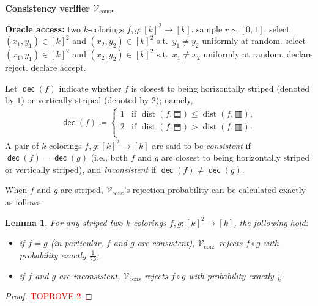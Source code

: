 \documentclass[11pt,fleqn]{article}
\renewcommand{\leq}{\leqslant}
\newcommand{\defeq}{\coloneq}
\DeclareMathOperator{\rHam}{\mathrm{dist}}
\DeclareMathOperator{\dec}{\mathsf{dec}}
\newcommand{\V}{\calV}
\newcommand{\Accept}{\textsf{accept}\xspace}
\newcommand{\Reject}{\textsf{reject}\xspace}
\newcommand{\f}{f}
\newcommand{\g}{g}
\newcommand{\hor}{\squarehfill}
\newcommand{\ver}{\squarevfill}
\newcommand{\Vcons}{\V_\mathrm{cons}}
\newcommand{\calV}{\mathcal{V}}
\newtheorem{lemma}[theorem]{Lemma}
\theoremstyle{definition}
\numberwithin{equation}{section}
\begin{document}
\begin{itembox}[l]{\textbf{Consistency verifier $\Vcons$.}}
\begin{algorithmic}[1]
    \item[\textbf{Oracle access:}]
        two $k$-colorings $\f, \g \colon [k]^2 \to [k]$.
    \State sample $r \sim [0,1]$.
    \If{$0 \leq r < \frac{1}{2}$} 
        \State select $(x_1,y_1) \in [k]^2$ and $(x_2,y_2) \in [k]^2$
            s.t.~$y_1 \neq y_2$ uniformly at random.
    \Else {}
        \State select $(x_1,y_1) \in [k]^2$ and $(x_2,y_2) \in [k]^2$
            s.t.~$x_1 \neq x_2$ uniformly at random.
    \EndIf
    \If{$\f(x_1,y_1) = \g(x_2,y_2)$}
        \State declare \Reject.
    \Else
        \State declare \Accept.
    \EndIf
\end{algorithmic}
\end{itembox}


Let $\dec(\f)$ indicate whether $\f$ is closest to being
horizontally striped (denoted by $1$) or vertically striped (denoted by $2$); namely,
\begin{align}
    \dec(\f) \defeq
    \begin{cases}
        1 & \text{if } \rHam(\f, \hor) \leq \rHam(\f, \ver), \\
        2 & \text{if } \rHam(\f, \hor) > \rHam(\f, \ver). \\
    \end{cases}
\end{align}
A pair of $k$-colorings $\f,\g \colon [k]^2 \to [k]$ are said to be
\emph{consistent} if $\dec(\f) = \dec(\g)$
(i.e., both $\f$ and $\g$ are closest to
being horizontally striped or vertically striped), and
\emph{inconsistent} if $\dec(\f) \neq \dec(\g)$.


When $\f$ and $\g$ are striped,
$\Vcons$'s rejection probability can be calculated exactly as follows.


\begin{lemma}
\label{lem:Cut-hard:cons:striped}
    For any striped two $k$-colorings $\f,\g \colon [k]^2 \to [k]$,
    the following hold\textup{:}
\begin{itemize}
    \item if $\f = \g$ (in particular, $\f$ and $\g$ are consistent),
    $\Vcons$ rejects $\f \circ \g$
    with probability exactly $\frac{1}{2k}$\textup{;}
\item if $\f$ and $\g$ are inconsistent,
    $\Vcons$ rejects $\f \circ \g$
    with probability exactly $\frac{1}{k}$.
\end{itemize}
\end{lemma}
\begin{proof}\textcolor{red}{TOPROVE 2}\end{proof}
\end{document}
